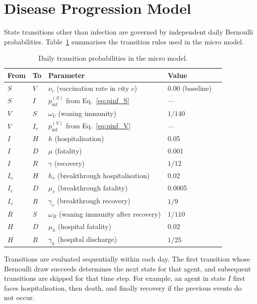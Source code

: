 \section{Disease Progression Model}
\label{sec:progression}

State transitions other than infection are governed by independent daily Bernoulli probabilities.
Table~\ref{tab:transitions} summarises the transition rules used in the micro model.

\begin{table}[ht]
\centering
\caption{Daily transition probabilities in the micro model.}
\label{tab:transitions}
\begin{tabular}{@{}lllll@{}}
\toprule
\textbf{From} & \textbf{To} & \textbf{Parameter} & \textbf{Value} \\
\midrule
$S$ & $V$  & $\nu_c$ (vaccination rate in city $c$) & 0.00 (baseline) \\
$S$ & $I$  & $p_{\mathrm{inf}}^{(S)}$ from Eq.~\eqref{eq:pinf_S} & --- \\
\midrule
$V$ & $S$  & $\omega_V$ (waning immunity) & $1/140$ \\
$V$ & $I_v$& $p_{\mathrm{inf}}^{(V)}$ from Eq.~\eqref{eq:pinf_V} & --- \\
\midrule
$I$ & $H$  & $h$ (hospitalisation) & 0.05 \\
$I$ & $D$  & $\mu$ (fatality) & 0.001 \\
$I$ & $R$  & $\gamma$ (recovery) & $1/12$ \\
\midrule
$I_v$ & $H$ & $h_v$ (breakthrough hospitalisation) & 0.02 \\
$I_v$ & $D$ & $\mu_v$ (breakthrough fatality) & 0.0005 \\
$I_v$ & $R$ & $\gamma_v$ (breakthrough recovery) & $1/9$ \\
\midrule
$R$ & $S$  & $\omega_R$ (waning immunity after recovery) & $1/110$ \\
\midrule
$H$ & $D$  & $\mu_h$ (hospital fatality) & 0.02 \\
$H$ & $R$  & $\gamma_h$ (hospital discharge) & $1/25$ \\
\bottomrule
\end{tabular}
\end{table}

Transitions are evaluated sequentially within each day.
The first transition whose Bernoulli draw succeeds determines the next state for that agent, and subsequent transitions are skipped for that time step.
For example, an agent in state $I$ first faces hospitalisation, then death, and finally recovery if the previous events do not occur.

